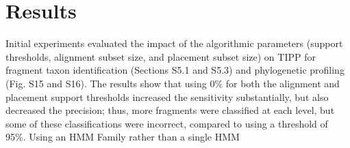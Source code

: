 \section{Results}\label{tipp:results}
Initial experiments evaluated the impact of the
algorithmic parameters (support thresholds, alignment subset size,
and placement subset size) on TIPP for fragment taxon identification 
(Sections S5.1 and S5.3)
and phylogenetic profiling (Fig. S15 and S16).
The results show that using 0\% for both the
alignment and placement support thresholds
increased the sensitivity substantially, but also
decreased the precision; thus, more fragments were
classified at each level, but some of these classifications
were incorrect, compared to using a threshold of 95\%.
Using an HMM Family rather than a single HMM
